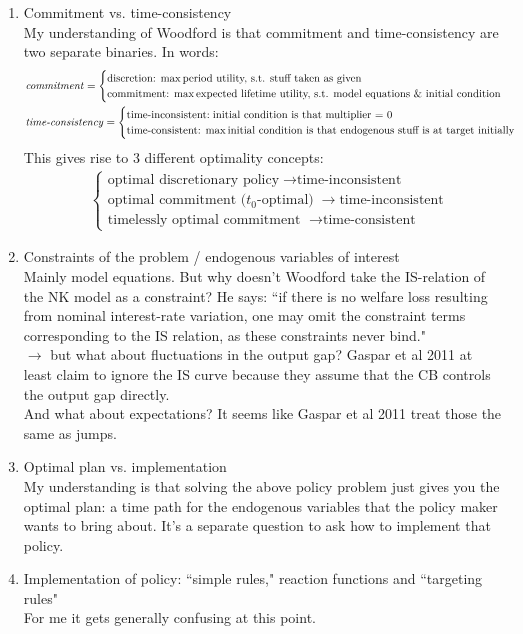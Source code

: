 \documentclass[11pt]{article}
\renewcommand{\[}{\begin{equation}}
\renewcommand{\]}{\end{equation}}
\begin{document}
\begin{enumerate}
\item Commitment vs. time-consistency \\
My understanding of Woodford is that commitment and time-consistency are two separate binaries. In words:
\begin{align*}
& \text{\emph{commitment}} = \begin{cases} \text{discretion:} \; \max \text{period utility, s.t. stuff taken as given}\\
\text{commitment:} \; \max \text{expected lifetime utility, s.t. model equations \& initial condition}
\end{cases} \\
& \text{\emph{time-consistency}} = \begin{cases} \text{time-inconsistent:} \; \text{initial condition is that multiplier = 0}\\
\text{time-consistent:} \; \max \text{initial condition is that endogenous stuff is at target initially}
\end{cases}
\end{align*}
This gives rise to 3 different optimality concepts:
\begin{align*}
& \begin{cases} \text{optimal discretionary policy} \; \rightarrow \text{time-inconsistent}\\
\text{optimal commitment ($t_0$-optimal)} \; \rightarrow \text{time-inconsistent} \\
\text{timelessly optimal commitment } \; \rightarrow \text{time-consistent} 
\end{cases}
\end{align*}
\item Constraints of the problem / endogenous variables of interest \\
Mainly model equations. But why doesn't Woodford take the IS-relation of the NK model as a constraint? He says: ``if there is no welfare loss resulting from nominal interest-rate variation, one may omit the constraint terms corresponding to the IS relation, as these constraints never bind." \\
$\rightarrow$ but what about fluctuations in the output gap? Gaspar et al 2011 at least claim to ignore the IS curve because they assume that the CB controls the output gap directly.\\
And what about expectations? It seems like Gaspar et al 2011 treat those the same as jumps. 
\item Optimal plan vs. implementation \\
My understanding is that solving the above policy problem just gives you the optimal plan: a time path for the endogenous variables that the policy maker wants to bring about. It's a separate question to ask how to implement that policy. 
\item Implementation of policy: ``simple rules," reaction functions and ``targeting rules" \\
For me it gets generally confusing at this point. 
\end{enumerate}
\end{document}
